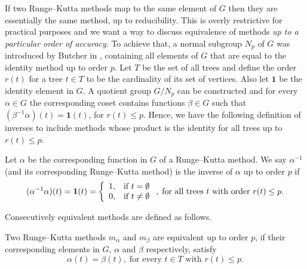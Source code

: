 \indent If two Runge--Kutta methods map to the same element of $G$ then they are essentially the same method, up to reducibility. This is overly restrictive for practical purposes and we want a way to discuss equivalence of methods \emph{up to a particular order of accuracy}. To achieve that, a normal subgroup $N_p$ of $G$ was introduced by Butcher in \cite{Butcher2008_book}, containing all elements of $G$ that are equal to the identity method up to order $p$. Let $T$ be the set of all trees and define the order $r(t)$ for a  tree $t \in T$ to be the cardinality of its set of vertices. Also let $\bm{1}$ be the identity element in $G$. A quotient group $G/N_p$ can be constructed and for every $\alpha \in G$ the corresponding coset contains functions $\beta \in G$ such that $(\beta^{-1}\alpha)(t) = \bm{1}(t)$, for $r(t) \leq p$. Hence, we have the following definition of inverses to include methods whose product is the identity for all trees up to $r(t) \leq p$.
\begin{definition}\label{def:Inverse_up_to_p}
	Let $\alpha$ be the corresponding function in $G$ of a Runge--Kutta method. We say $\alpha^{-1}$ (and its corresponding
  Runge--Kutta method) is the inverse of $\alpha$ up to order $p$ if
  \begin{displaymath}
		(\alpha^{-1}\alpha)(t) = \bm{1}(t) = \left\{
  															\begin{array}{l l}
  																1, & \text{if $t = \emptyset$}\\
   																0, & \text{if $t \neq \emptyset$}
  															\end{array} \right., 
  		\; \text{for all trees $t$ with order $r(t) \leq p$.}
  	\end{displaymath}
\end{definition}
\noindent Consecutively equivalent methods are defined as follows.
\begin{definition}\label{def:Equivalent_methods}
	Two Runge--Kutta methods $m_\alpha$ and $m_\beta$ are equivalent up to order $p$, if their corresponding elements in $G$, $\alpha$ and $\beta$ respectively, satisfy
	\begin{displaymath}
		\alpha(t) = \beta(t), \; \text{for every $t \in T$ with $r(t) \leq p$}.
	\end{displaymath}
\end{definition}


